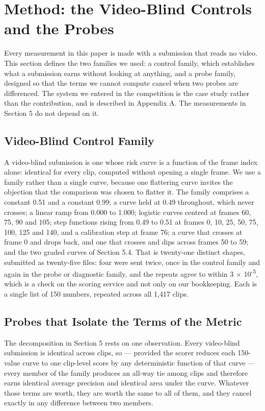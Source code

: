 \section{Method: the Video-Blind Controls and the Probes}

Every measurement in this paper is made with a submission that reads no video.
This section defines the two families we used: a control family, which
establishes what a submission earns without looking at anything, and a probe
family, designed so that the terms we cannot compute cancel when two probes are
differenced. The system we entered in the competition is the case study rather than the contribution, and is described in Appendix A. The measurements in Section 5 do not depend on it.

\subsection{Video-Blind Control Family}

A video-blind submission is one whose risk curve is a function of the frame index alone: identical for every clip, computed without opening a single frame. We use a family rather than a single curve, because one flattering curve invites the objection that the comparison was chosen to flatter it. The family comprises a constant 0.51 and a constant 0.99; a curve held at 0.49 throughout, which never crosses; a linear ramp from 0.000 to 1.000; logistic curves centred at frames 60, 75, 90 and 105; step functions rising from 0.49 to 0.51 at frames 0, 10, 25, 50, 75, 100, 125 and 140, and a calibration step at frame 76; a curve that crosses at frame 0 and drops back, and one that crosses and dips across frames 50 to 59; and the two graded curves of Section 5.4. That is twenty-one distinct shapes, submitted as twenty-five files: four were sent twice, once in the control family and again in the probe or diagnostic family, and the repeats agree to within 3 × 10\textsuperscript{-5}, which is a check on the scoring service and not only on our bookkeeping. Each is a single list of 150 numbers, repeated across all 1,417 clips.


\subsection{Probes that Isolate the Terms of the Metric}

The decomposition in Section 5 rests on one observation. Every video-blind submission is identical across clips, so --- provided the scorer reduces each 150-value curve to one clip-level score by any deterministic function of that curve --- every member of the family produces an all-way tie among clips and therefore earns identical average precision and identical area under the curve. Whatever those terms are worth, they are worth the same to all of them, and they cancel exactly in any difference between two members.

